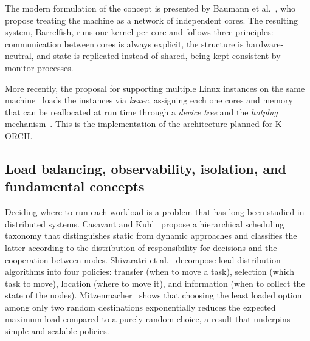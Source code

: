 \documentclass[12pt]{article}
\begin{document}
The modern formulation of the concept is presented by Baumann et al.~\cite{baumann2009multikernel}, who propose treating
the machine as a network of independent cores.
The resulting system, Barrelfish, runs one kernel per core and
follows three principles: communication between cores is always explicit, the structure is hardware-neutral, and
state is replicated instead of shared, being kept consistent by monitor processes.

More recently, the proposal for supporting multiple Linux instances on the same machine~\cite{wang2025multikernel}
loads the instances via \textit{kexec}, assigning each one cores and memory that can be reallocated at
run time through a \textit{device tree} and the \textit{hotplug} mechanism~\cite{wang2025lpc}.
This is the implementation of the architecture planned for K-ORCH.

\subsection{Load balancing, observability, isolation, and fundamental concepts} \label{sec:rel-fundamentos}

Deciding where to run each workload is a problem that has long been studied in distributed systems.
Casavant and Kuhl~\cite{casavant1988taxonomy} propose a hierarchical scheduling taxonomy that distinguishes
static from dynamic approaches and classifies the latter according to the distribution of responsibility for decisions and the
cooperation between nodes.
Shivaratri et al.~\cite{shivaratri1992load} decompose load distribution algorithms
into four policies: transfer (when to move a task), selection (which task to move), location
(where to move it), and information (when to collect the state of the nodes).
Mitzenmacher~\cite{mitzenmacher2001power}
shows that choosing the least loaded option among only two random destinations exponentially reduces the expected maximum
load compared to a purely random choice, a result that underpins simple and scalable policies.
\end{document}
